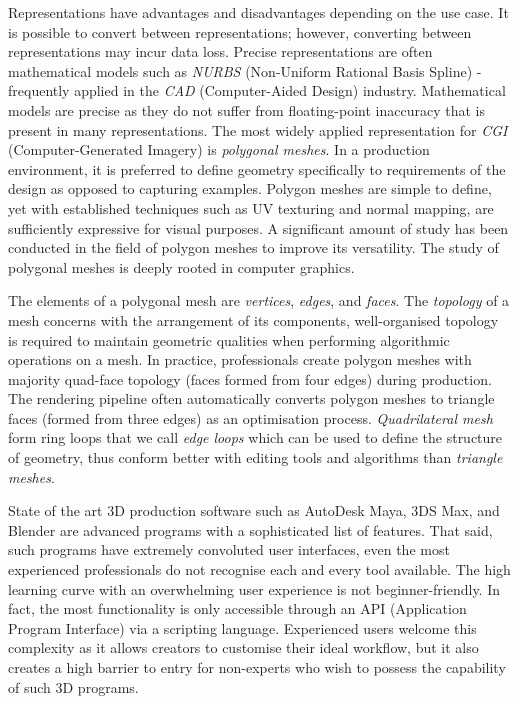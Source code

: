 \documentclass[ %
author={Dillon Keith Diep},
supervisor={Dr. Carl Henrik Ek},
degree={MEng},
title={ART-CG:},
subtitle={Assisted Real-time Content Generation of 3D Hair by Learning Manifolds},
type={Research},
year={2017} ]{dissertation}
\begin{document}
Representations have advantages and disadvantages depending on the use case. It is possible to convert between representations; however, converting between representations may incur data loss. Precise representations are often mathematical models such as \textit{NURBS} (Non-Uniform Rational Basis Spline) - frequently applied in the \textit{CAD} (Computer-Aided Design) industry. Mathematical models are precise as they do not suffer from floating-point inaccuracy that is present in many representations. The most widely applied representation for \textit{CGI} (Computer-Generated Imagery) is \textit{polygonal meshes}. In a production environment, it is preferred to define geometry specifically to requirements of the design as opposed to capturing examples. Polygon meshes are simple to define, yet with established techniques such as UV texturing and normal mapping, are sufficiently expressive for visual purposes. A significant amount of study has been conducted in the field of polygon meshes to improve its versatility. The study of polygonal meshes is deeply rooted in computer graphics.

The elements of a polygonal mesh are \textit{vertices}, \textit{edges}, and \textit{faces}. The \textit{topology} of a mesh concerns with the arrangement of its components, well-organised topology is required to maintain geometric qualities when performing algorithmic operations on a mesh. In practice, professionals create polygon meshes with majority quad-face topology (faces formed from four edges) during production. The rendering pipeline often automatically converts polygon meshes to triangle faces (formed from three edges) as an optimisation process. \textit{Quadrilateral mesh} form ring loops that we call \textit{edge loops} which can be used to define the structure of geometry, thus conform better with editing tools and algorithms than \textit{triangle meshes}.

State of the art 3D production software such as AutoDesk Maya, 3DS Max, and Blender are advanced programs with a sophisticated list of features. That said, such programs have extremely convoluted user interfaces, even the most experienced professionals do not recognise each and every tool available. The high learning curve with an overwhelming user experience is not beginner-friendly. In fact, the most functionality is only accessible through an API (Application Program Interface) via a scripting language.  Experienced users welcome this complexity as it allows creators to customise their ideal workflow, but it also creates a high barrier to entry for non-experts who wish to possess the capability of such 3D programs.
\end{document}
